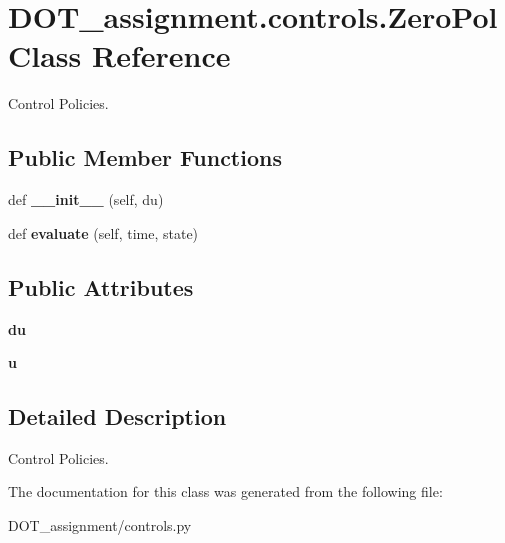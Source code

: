 \hypertarget{class_d_o_t__assignment_1_1controls_1_1_zero_pol}{}\section{D\+O\+T\+\_\+assignment.\+controls.\+Zero\+Pol Class Reference}
\label{class_d_o_t__assignment_1_1controls_1_1_zero_pol}


Control Policies.  


\subsection*{Public Member Functions}
\begin{DoxyCompactItemize}
\item 
\mbox{\label{class_d_o_t__assignment_1_1controls_1_1_zero_pol_a119be29a027d81c3b6e0b29fa562502d}} 
def {\bfseries \+\_\+\+\_\+init\+\_\+\+\_\+} (self, du)
\item 
\mbox{\label{class_d_o_t__assignment_1_1controls_1_1_zero_pol_abc0269c149edcf4073562011b351ee1f}} 
def {\bfseries evaluate} (self, time, state)
\end{DoxyCompactItemize}
\subsection*{Public Attributes}
\begin{DoxyCompactItemize}
\item 
\mbox{\label{class_d_o_t__assignment_1_1controls_1_1_zero_pol_afd79d454fbcfa380dcd073c35cf8cbdd}} 
{\bfseries du}
\item 
\mbox{\label{class_d_o_t__assignment_1_1controls_1_1_zero_pol_aea3cfdd7f7268119f3dabb34653f6f69}} 
{\bfseries u}
\end{DoxyCompactItemize}


\subsection{Detailed Description}
Control Policies. 

The documentation for this class was generated from the following file\+:\begin{DoxyCompactItemize}
\item 
D\+O\+T\+\_\+assignment/controls.\+py\end{DoxyCompactItemize}

